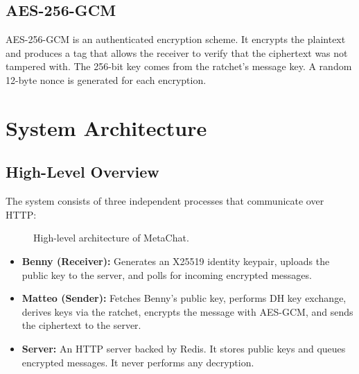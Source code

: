 \documentclass[12pt,a4paper]{article}
\begin{document}
\subsection{AES-256-GCM}

AES-256-GCM is an authenticated encryption scheme. It encrypts the plaintext and produces a tag that allows the receiver to verify that the ciphertext was not tampered with. The 256-bit key comes from the ratchet's message key. A random 12-byte nonce is generated for each encryption.

\section{System Architecture}
\label{sec:architecture}

\subsection{High-Level Overview}

The system consists of three independent processes that communicate over HTTP:

\begin{figure}[H]
\centering
{}
\caption{High-level architecture of MetaChat.}
\label{fig:arch}
\end{figure}

\begin{itemize}
    \item \textbf{Benny (Receiver):} Generates an X25519 identity keypair, uploads the public key to the server, and polls for incoming encrypted messages.
    \item \textbf{Matteo (Sender):} Fetches Benny's public key, performs DH key exchange, derives keys via the ratchet, encrypts the message with AES-GCM, and sends the ciphertext to the server.
    \item \textbf{Server:} An HTTP server backed by Redis. It stores public keys and queues encrypted messages. It never performs any decryption.
\end{itemize}
\end{document}
